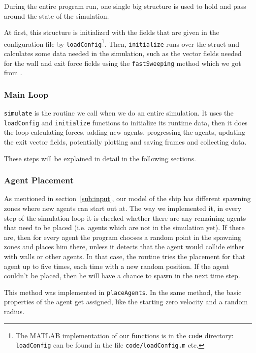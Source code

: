 \documentclass[11pt]{article}
\begin{document}
During the entire program run, one single big structure is used to hold and
pass around the state of the simulation.

At first, this structure is initialized with the fields that are given in the
configuration file by \texttt{loadConfig}\footnote{The MATLAB implementation of
our functions is in the \texttt{code} directory: \texttt{loadConfig} can be
found in the file \texttt{code/loadConfig.m} etc.}.  Then, \texttt{initialize}
runs over the struct and calculates some data needed in the simulation, such as
the vector fields needed for the wall and exit force fields using the
\texttt{fastSweeping} method which we got from \cite{multilevel}.

\subsubsection{Main Loop}

\texttt{simulate} is the routine we call when we do an entire simulation.  It
uses the \texttt{loadConfig} and \texttt{initialize} functions to initialize
its runtime data, then it does the loop calculating forces, adding new agents,
progressing the agents, updating the exit vector fields, potentially plotting
and saving frames and collecting data.

These steps will be explained in detail in the following sections.

\subsubsection{Agent Placement}

As mentioned in section~\ref{sub:input}, our model of the ship has different
spawning zones where new agents can start out at.  The way we implemented it,
in every step of the simulation loop it is checked whether there are any
remaining agents that need to be placed (i.e. agents which are not in the
simulation yet).  If there are, then for every agent the program chooses a
random point in the spawning zones and places him there, unless it detects that
the agent would collide either with walls or other agents.  In that case, the
routine tries the placement for that agent up to five times, each time with a
new random position.  If the agent couldn't be placed, then he will have a
chance to spawn in the next time step.

This method was implemented in \texttt{placeAgents}.  In the same method, the
basic properties of the agent get assigned, like the starting zero velocity and
a random radius.
\end{document}
